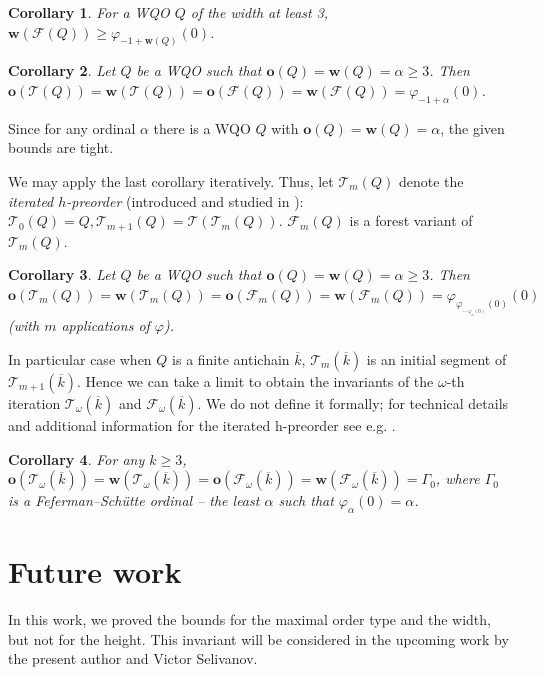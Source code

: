 \documentclass[10pt,a4paper]{amsart}
\let \geq \geqslant
\let \phi \varphi
\def \T {\mathcal{T}}
\def \F {\mathcal{F}}
\def \o {\textbf{o}}
\def \w {\textbf{w}}
\newtheorem{corollary}{Corollary}
\begin{document}
\begin{corollary}
    For a WQO $Q$ of the width at least 3, $\w(\F(Q)) \geq \phi_{-1+\w(Q)}(0)$.
\end{corollary}

\begin{corollary}
    Let $Q$ be a WQO such that $\o(Q) = \w(Q) = \alpha \geq 3$. Then $\o(\T(Q)) = \w(\T(Q)) = \o(\F(Q)) = \w(\F(Q)) = \phi_{-1+\alpha}(0)$.
\end{corollary}

Since for any ordinal $\alpha$ there is a WQO $Q$ with $\o(Q) = \w(Q) = \alpha$, the given bounds are tight.

We may apply the last corollary iteratively. Thus, let $\T_m(Q)$ denote the \textit{iterated $h$-preorder} (introduced and studied in \cite{Selivanov2011}): $\T_0(Q) = Q, \T_{m+1}(Q) = \T(\T_m(Q))$. $\F_m(Q)$ is a forest variant of $\T_m(Q)$.

\begin{corollary}
    Let $Q$ be a WQO such that $\o(Q) = \w(Q) = \alpha \geq 3$. Then $\o(\T_m(Q)) = \w(\T_m(Q)) = \o(\F_m(Q)) = \w(\F_m(Q)) = \phi_{\phi_{\dots_{\phi_\alpha(0)}}(0)}(0)$ (with $m$ applications of $\phi$).
\end{corollary}

In particular case when $Q$ is a finite antichain $\overline{k}$, $\T_m\left(\overline{k}\right)$ is an initial segment of $\T_{m+1}\left(\overline{k}\right)$. Hence we can take a limit to obtain the invariants of the $\omega$-th iteration $\T_\omega\left(\overline{k}\right)$ and $\F_\omega\left(\overline{k}\right)$. We do not define it formally; for technical details and additional information for the iterated h-preorder see e.g. \cite{Selivanov2011,Selivanov2022,Alaev2025}.

\begin{corollary}
    For any $k \geq 3$, $\o(\T_\omega\left(\overline{k}\right)) = \w(\T_\omega\left(\overline{k}\right)) = \o(\F_\omega\left(\overline{k}\right)) = \w(\F_\omega\left(\overline{k}\right)) = \Gamma_0$, where $\Gamma_0$ is a Feferman–Schütte ordinal -- the least $\alpha$ such that $\phi_\alpha(0) = \alpha$.
\end{corollary}

\section{Future work}

In this work, we proved the bounds for the maximal order type and the width, but not for the height. This invariant will be considered in the upcoming work by the present author and Victor Selivanov.
\end{document}
